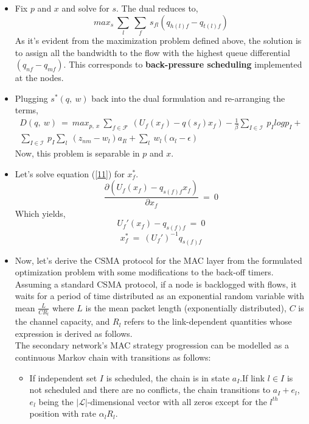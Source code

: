\documentclass[12pt, draftcls, onecolumn]{IEEEtran}
\begin{document}
\begin{itemize}
    \item Fix $p$ and $x$ and solve for $s$. The dual reduces to,
    \[max_s\ \sum_{l}\ \sum_{f}\ s_{fl}(q_{h(l)f} - q_{t(l)f})\]
    As it's evident from the maximization problem defined above, the solution is to assign all the bandwidth to the flow with the highest queue differential $(q_{nf} - q_{mf})$. This corresponds to \textbf{back-pressure scheduling} implemented at the nodes.
    \item Plugging $s^*(q,\ w)$ back into the dual formulation and re-arranging the terms,
    \begin{equation}\label{11}
        \begin{aligned}
            D(q,\ w)\ =\ max_{p,\ x}\ \sum_{f \in \mathcal{F}}\ (U_f(x_f) - q(s_f)x_f) - \frac{1}{\beta}\sum_{I \in \mathcal{I}}\ p_I log p_I + \\\sum_{I \in \mathcal{I}}\ p_I\sum_{l}\ (z_{nm} - w_l)a_{Il} + \sum_{l}\ w_l(\alpha_l - \epsilon)
        \end{aligned}
    \end{equation}
    Now, this problem is separable in $p$ and $x$.
    \item Let's solve equation (\ref{11}) for $x_f^*$.
    \[\frac{\partial (U_f(x_f) - q_{s(f)f}x_f)}{\partial x_f}\ =\ 0\]
    Which yields,
    \[U_f'(x_f) - q_{s(f)f}\ =\ 0\]
    \[x_f^*\ =\ (U_f')^{-1} q_{s(f)f}\]
    \item Now, let's derive the CSMA protocol for the MAC layer from the formulated optimization problem with some modifications to the back-off timers.
    \\Assuming a standard CSMA protocol, if a node is backlogged with flows, it waits for a period of time distributed as an exponential random variable with mean $\frac{L}{CR_l}$ where $L$ is the mean packet length (exponentially distributed), $C$ is the channel capacity, and $R_l$ refers to the link-dependent quantities whose expression is derived as follows.
    \\The secondary network's MAC strategy progression can be modelled as a continuous Markov chain with transitions as follows:
    \begin{itemize}
        \item If independent set $I$ is scheduled, the chain is in state $a_I$.If link $l \in I$ is not scheduled and there are no conflicts, the chain transitions to $a_I + e_l$, $e_l$ being the $|\mathcal{L}|$-dimensional vector with all zeros except for the $l^{th}$ position with rate $\alpha_l R_l$.

\end{itemize}
\end{itemize}
\end{document}
